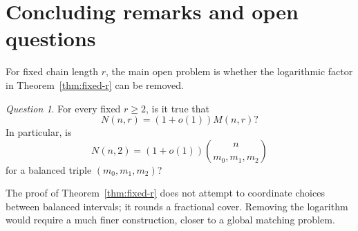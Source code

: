 \documentclass[11pt]{article}
\theoremstyle{definition}
\theoremstyle{remark}
\newtheorem{question}[theorem]{Question}
\begin{document}

\section{Concluding remarks and open questions}\label{sec:open}


For fixed chain length $r$, the main open problem is whether the logarithmic factor in Theorem~\ref{thm:fixed-r} can be removed.

\begin{question}
For every fixed $r\ge 2$, is it true that
\[
   N(n,r)=(1+o(1))M(n,r)?
\]
In particular, is
\[
   N(n,2)=(1+o(1))\binom{n}{m_0,m_1,m_2}
\]
for a balanced triple $(m_0,m_1,m_2)$?
\end{question}

The proof of Theorem~\ref{thm:fixed-r} does not attempt to coordinate choices between balanced intervals; it rounds a fractional cover.  Removing the logarithm would require a much finer construction, closer to a global matching problem.




\medskip
\end{document}

